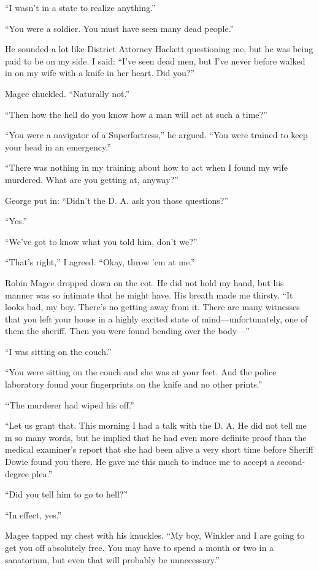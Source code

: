 \documentclass{novel}
\begin{document}
{“I wasn’t in a state to realize anything.”

“You were a soldier. You must have seen many dead people.”

He sounded a lot like District Attorney Hackett questioning me, but he was being paid to be on my side. I said: “I’ve seen dead men, but I’ve never before walked in on my wife with a knife in her heart. Did you?”

Magee chuckled. “Naturally not.”

“Then how the hell do you know how a man will act at such a time?”

“You were a navigator of a Superfortress,” he argued. “You were trained to keep your head in an emergency.”

“There was nothing in my training about how to act when I found my wife murdered. What are you getting at, anyway?”

George put in: “Didn’t the D. A. ask you those questions?”

“Yes.”

“We’ve got to know what you told him, don’t we?”

“That’s right,” I agreed. “Okay, throw ’em at me.”

Robin Magee dropped down on the cot. He did not hold my hand, but his manner was so intimate that he might have. His breath made me thirsty. “It looks bad, my boy. There’s no getting away from it. There are many witnesses that you left your house in a highly excited state of mind—unfortunately, one of them the sheriff. Then you were found bending over the body—”

“I was sitting on the couch.”

“You were sitting on the couch and she was at your feet. And the police laboratory found your fingerprints on the knife and no other prints.”

‘‘The murderer had wiped his off.”

“Let us grant that. This morning I had a talk with the D. A. He did not tell me m so many words, but he implied that he had even more definite proof than the medical examiner’s report that she had been alive a very short time before Sheriff Dowie found you there. He gave me this much to induce me to accept a second-degree plea.”

“Did you tell him to go to hell?”

“In effect, yes.”

Magee tapped my chest with his knuckles. “My boy, Winkler and I are going to get you off absolutely free. You may have to spend a month or two in a sanatorium, but even that will probably be unnecessary.”

}
\end{document}
